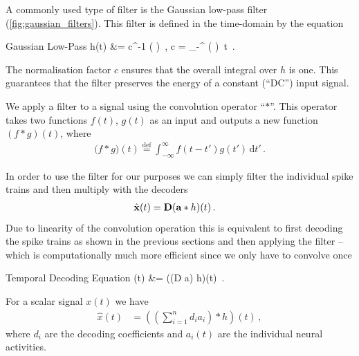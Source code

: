 \documentclass[10pt,letterpaper,oneside]{article}
\begin{document}
A commonly used type of filter is the Gaussian low-pass filter (\cref{fig:gaussian_filters}). This filter is defined in the time-domain by the equation
\begin{ImportantEqn}{Gaussian Low-Pass}
	h(t) &= c^{-1} \exp\left( \right) \,, \quad {} c = \int_{-\infty}^{\infty} \exp\left( \right) \,t \,.
\end{ImportantEqn}
The normalisation factor $c$ ensures that the overall integral over $h$ is one. This guarantees that the filter preserves the energy of a constant (\enquote{DC}) input signal.

We apply a filter to a signal using the convolution operator \enquote{$\ast$}. This operator takes two functions $f(t)$, $g(t)$ as an input and outputs a new function $(f \ast g)(t)$, where
\begin{align*}
	\big( f \ast g \big)(t) \overset{\text{def}}= \int_{-\infty}^{\infty} f(t - t') g(t') \,\mathrm{d}t'\,.
\end{align*}


In order to use the filter for our purposes we can simply filter the individual spike trains and then multiply with the decoders 
\begin{align*}
	\hat{{\mathbf{x}}}(t) &= {\mathbf{D}} ({\mathbf{a}} \ast h)(t) \,.
\end{align*}
Due to linearity of the convolution operation this is equivalent to first decoding the spike trains as shown in the previous sections and then applying the filter -- which is computationally much more efficient since we only have to convolve once
\begin{ImportantEqn}{Temporal Decoding Equation}
	(t) &= \big((\mat D \vec a) \ast h\big)(t) \,.
	\label{eqn:temporal_decoding_equation}
\end{ImportantEqn}
For a scalar signal $x(t)$ we have
\begin{align*}
	\hat{x}(t) &= \left( \left( \sum_{i = 1}^n d_i a_i \right) \ast h\right)(t) \,,
\end{align*}
where $d_i$ are the decoding coefficients and $a_i(t)$ are the individual neural activities.
\end{document}
